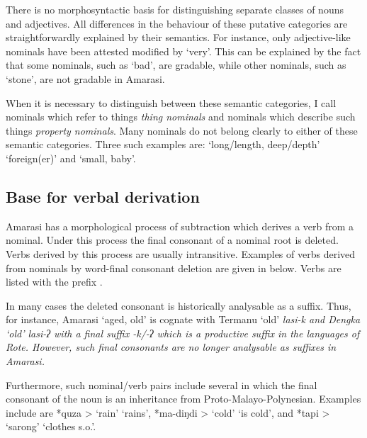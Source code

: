 There is no morphosyntactic basis for distinguishing
separate classes of nouns and adjectives.
All differences in the behaviour of these putative 
categories are straightforwardly explained by their semantics.
For instance, only adjective-like nominals have been attested modified by  `very'.
This can be explained by the fact that some
nominals, such as  `bad', are gradable,
while other nominals, such as  `stone', are not gradable in Amarasi.

When it is necessary to distinguish between these semantic categories,
I call nominals which refer to things \emph{thing nominals}
and nominals which describe such things \emph{property nominals}.
Many nominals do not belong clearly to either of these semantic categories.
Three such examples are:  `long/length, deep/depth'
 `foreign(er)' and  `small, baby'.

\subsection{Base for verbal derivation}\label{sec:BasVerDer}
Amarasi has a morphological process of subtraction which derives a verb from a nominal.
Under this process the final consonant of a nominal root is deleted.
Verbs derived by this process are usually intransitive.
Examples of verbs derived from nominals by word-final consonant deletion
are given in  below.
Verbs are listed with the  prefix .

In many cases the deleted consonant is historically analysable as a suffix.
Thus, for instance, Amarasi  `aged, old'
is cognate with Termanu `old' \it{lasi-k} and Dengka `old' \it{lasi-ʔ}
with a final suffix \it{-k/-ʔ} which is
a productive suffix in the languages of Rote.
However, such final consonants are no longer
analysable as suffixes in Amarasi.

Furthermore, such nominal/verb pairs include several
in which the final consonant of the noun is an inheritance from Proto-Malayo-Polynesian.
Examples include are *quza >  `rain' {\ra}  `rains',
*ma-diŋdi >  `cold' {\ra}  `is cold',
and *tapi >  `sarong' {\ra}  `clothes s.o.'.

